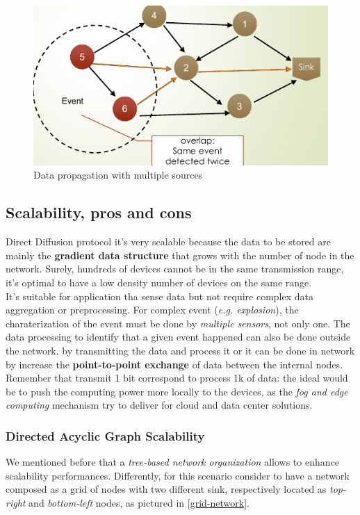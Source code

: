 \documentclass[10pt,a4paper]{report}
\theoremstyle{definition}
\begin{document}
\begin{figure}[h]
	\centering\includegraphics[scale=0.50]{images/Pasted image 20230522175419.png}
	\caption{Data propagation with multiple sources}
\end{figure}

\subsection{Scalability, pros and cons}\label{sec:scalability-pros-and-cons}
Direct Diffusion protocol it's very scalable because the data to be stored are mainly the \textbf{gradient data structure} that grows with the number of node in the network. Surely, hundreds of devices cannot be in the same transmission range, it's optimal to have a low density number of devices on the same range.\\
It's suitable for application tha sense data but not require complex data aggregation or preprocessing. For complex event (\textit{e.g. explosion}), the charaterization of the event must be done by \textit{multiple sensors}, not only one.
The data processing to identify that a given event happened can also be done outside the network, by transmitting the data and process it or it can be done in network by increase the \textbf{point-to-point exchange} of data between the internal nodes.
Remember that transmit 1 bit correspond to process 1k of data: the ideal would be to push the computing power more locally to the devices, as the \textit{fog and edge computing} mechanism try to deliver for cloud and data center solutions.
\subsubsection{Directed Acyclic Graph Scalability}\label{sec:directed-acyclic-graph-scalability}
We mentioned before that a \textit{tree-based network organization} allows to enhance scalability performances.
Differently, for this scenario consider to have a network composed as a grid of nodes with two different sink, respectively located as \textit{top-right} and \textit{bottom-left} nodes, as pictured in \ref{grid-network}.
\end{document}
